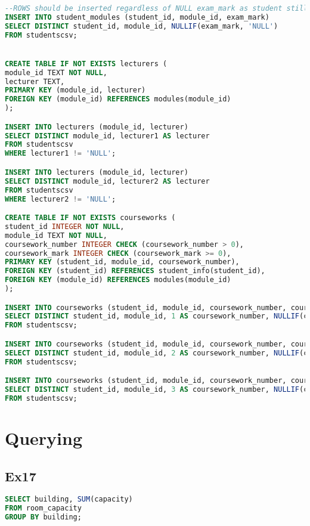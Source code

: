 \documentclass{article}
\begin{document}
\begin{lstlisting}[language=SQL, caption=SQL Code to create and populate the tables in the database]
--ROWS should be inserted regardless of NULL exam_mark as student still takes the module
INSERT INTO student_modules (student_id, module_id, exam_mark)
SELECT DISTINCT student_id, module_id, NULLIF(exam_mark, 'NULL')
FROM studentscsv;


CREATE TABLE IF NOT EXISTS lecturers (
module_id TEXT NOT NULL,
lecturer TEXT,
PRIMARY KEY (module_id, lecturer)
FOREIGN KEY (module_id) REFERENCES modules(module_id)
);

INSERT INTO lecturers (module_id, lecturer)
SELECT DISTINCT module_id, lecturer1 AS lecturer
FROM studentscsv
WHERE lecturer1 != 'NULL';

INSERT INTO lecturers (module_id, lecturer)
SELECT DISTINCT module_id, lecturer2 AS lecturer
FROM studentscsv
WHERE lecturer2 != 'NULL';

CREATE TABLE IF NOT EXISTS courseworks (
student_id INTEGER NOT NULL,
module_id TEXT NOT NULL,
coursework_number INTEGER CHECK (coursework_number > 0),
coursework_mark INTEGER CHECK (coursework_mark >= 0),
PRIMARY KEY (student_id, module_id, coursework_number),
FOREIGN KEY (student_id) REFERENCES student_info(student_id),
FOREIGN KEY (module_id) REFERENCES modules(module_id)
);

INSERT INTO courseworks (student_id, module_id, coursework_number, coursework_mark)
SELECT DISTINCT student_id, module_id, 1 AS coursework_number, NULLIF(coursework1, 'NULL') AS coursework_mark
FROM studentscsv;

INSERT INTO courseworks (student_id, module_id, coursework_number, coursework_mark)
SELECT DISTINCT student_id, module_id, 2 AS coursework_number, NULLIF(coursework2, 'NULL') AS coursework_mark
FROM studentscsv;

INSERT INTO courseworks (student_id, module_id, coursework_number, coursework_mark)
SELECT DISTINCT student_id, module_id, 3 AS coursework_number, NULLIF(coursework3, 'NULL') AS coursework_mark
FROM studentscsv;

\end{lstlisting}

\section{Querying}

\subsection{Ex17}
\begin{lstlisting}[language=SQL]
SELECT building, SUM(capacity)
FROM room_capacity
GROUP BY building;
\end{lstlisting}
\end{document}
